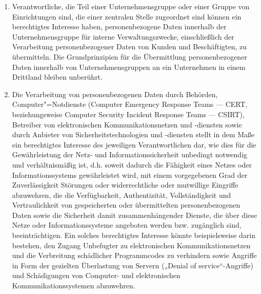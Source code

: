 \begin{enumerate}

   \item Verantwortliche, die Teil einer Unternehmensgruppe oder einer Gruppe von Einrichtungen sind, die einer
    zentralen Stelle zugeordnet sind können ein berechtigtes Interesse haben, personenbezogene Daten innerhalb der
    Unternehmensgruppe für interne Verwaltungszwecke, einschließlich der Verarbeitung personenbezogener Daten von
    Kunden und Beschäftigten, zu übermitteln. Die Grundprinzipien für die Übermittlung personenbezogener Daten
    innerhalb von Unternehmensgruppen an ein Unternehmen in einem Drittland bleiben unberührt.%
   \label{itm:eg-48}
   

   \item Die Verarbeitung von personenbezogenen Daten durch Behörden, Computer"=Notdienste (Computer Emergency Response
    Teams — CERT, beziehungsweise Computer Security Incident Response Teams — CSIRT), Betreiber von elektronischen
    Kommunikationsnetzen und -diensten sowie durch Anbieter von Sicherheitstechnologien und -diensten stellt in dem
    Maße ein berechtigtes Interesse des jeweiligen Verantwortlichen dar, wie dies für die Gewährleistung der Netz- und
    Informationssicherheit unbedingt notwendig und verhältnismäßig ist, d.h. soweit dadurch die Fähigkeit eines Netzes
    oder Informationssystems gewährleistet wird, mit einem vorgegebenen Grad der Zuverlässigkeit Störungen oder
    widerrechtliche oder mutwillige Eingriffe abzuwehren, die die Verfügbarkeit, Authentizität, Vollständigkeit und
    Vertraulichkeit von gespeicherten oder übermittelten personenbezogenen Daten sowie die Sicherheit damit
    zusammenhängender Dienste, die über diese Netze oder Informationssysteme angeboten werden bzw. zugänglich sind,
    beeinträchtigen. Ein solches berechtigtes Interesse könnte beispielsweise darin bestehen, den Zugang Unbefugter zu
    elektronischen Kommunikationsnetzen und die Verbreitung schädlicher Programmcodes zu verhindern sowie Angriffe in
    Form der gezielten Überlastung von Servern („Denial of service“-Angriffe) und Schädigungen von Computer- und
    elektronischen Kommunikationssystemen abzuwehren.%
   \label{itm:eg-49}
   


\end{enumerate}
